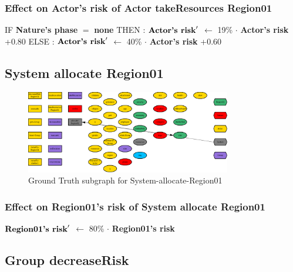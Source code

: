 \documentclass{article}%
\begin{document}
%
\subsubsection{Effect on Actor's risk of Actor takeResources Region01}%
\label{ssubsec:Effect on Actor's risk of Actor takeResources Region01}%
\begin{flushleft}%
IF %
\textbf{Nature's phase}%
$=$%
\textbf{none}%
\linebreak%
\hspace*{2em}%
THEN %
: %
$\mbox{\textbf{Actor's risk}} '$%
$\leftarrow$%
19\%%
$\cdot$%
\textbf{Actor's risk}%
+0.80%
\linebreak%
\hspace*{2em}%
ELSE %
: %
$\mbox{\textbf{Actor's risk}} '$%
$\leftarrow$%
40\%%
$\cdot$%
\textbf{Actor's risk}%
+0.60%
\end{flushleft}

%
\subsection{System allocate Region01}%
\label{subsec:System allocate Region01}%


\begin{figure}[ht]%
\centering%
\includegraphics[width=0.8\textwidth]{images/System-allocate-Region01.png}%
\caption{Ground Truth subgraph for System{-}allocate{-}Region01}%
\end{figure}

%
\subsubsection{Effect on Region01's risk of System allocate Region01}%
\label{ssubsec:Effect on Region01's risk of System allocate Region01}%
\begin{flushleft}%
$\mbox{\textbf{Region01's risk}} '$%
$\leftarrow$%
80\%%
$\cdot$%
\textbf{Region01's risk}%
\end{flushleft}

%
\subsection{Group decreaseRisk}%
\label{subsec:Group decreaseRisk}%
\end{document}
